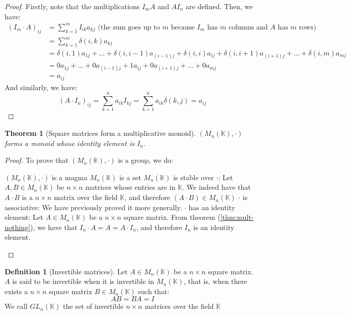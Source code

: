 \documentclass{article}
\newtheorem{theorem}{Theorem}[section]
\theoremstyle{definition}
\newtheorem{definition}{Definition}[section]
\theoremstyle{remark}
\theoremstyle{example}
\begin{document}
\begin{proof}
    Firstly, note that the multiplications $I_m A$ and $A I_n$ are defined. Then, we have:
	\begin{align*}
			(I_m \cdot A)_{ij} &= \sum_{k=1}^m I_{ik} a_{kj} \text{ (the sum goes up to $m$ because $I_m$ has $m$ columns and $A$ has $m$ rows)}\\
							   &= \sum_{k=1}^m \delta(i, k) a_{kj}\\
							   &= \delta(i, 1) a_{1j} + \dots + \delta(i, i-1) a_{(i-1)j} + \delta(i, i) a_{ij} + \delta(i, i+1) a_{(i+1)j} + \dots + \delta(i, m) a_{mj}\\
							   &= 0 a_{1j} + \dots + 0 a_{(i-1)j} + 1 a_{ij} + 0 a_{(i+1)j} + \dots + 0 a_{mj}\\
							   &= a_{ij}
	\end{align*}
	And similarly, we have:
			$$(A \cdot I_n)_{ij} = \sum_{k=1}^n a_{ik} I_{kj} = \sum_{k=1}^n a_{ik} \delta(k, j) = a_{ij}$$
\end{proof}

\begin{theorem}[Square matrices form a multiplicative monoid]
    $(M_n(\mathbb{K}), \cdot)$ forms a monoid whose identity element is $I_n$.
\end{theorem}

\begin{proof}
    To prove that $(M_n(\mathbb{K}), \cdot)$ is a group, we do:
    \begin{outline}
        \1 $(M_n(\mathbb{K}), \cdot)$ is a magma
            \2 $M_n(\mathbb{K})$ is a set
            \2 $M_n(\mathbb{K})$ is stable over $\cdot$: Let $A, B \in M_n(\mathbb{K})$ be $n \times n$ matrices whose entries are in $\mathbb{K}$. We indeed have that $A \cdot B$ is a $n \times n$ matrix over the field $\mathbb{K}$, and therefore $(A \cdot B) \in M_n(\mathbb{K})$
        \1 $\cdot$ is associative: We have previously proved it more generally. 
        \1 $\cdot$ has an identity element: Let $A \in M_n(\mathbb{K})$ be a $n \times n$ square matrix. From theorem (\ref{thm:mult-nothing}), we have that $I_n \cdot A = A = A \cdot I_n$, and therefore $I_n$ is an identity element.
    \end{outline}
\end{proof}

\begin{definition}[Invertible matrices]
    Let $A \in M_n(\mathbb{K})$ be a $n \times n$ square matrix. $A$ is said to be invertible when it is invertible in $M_n(\mathbb{K})$, that is, when there exists a $n \times n$ square matrix $B \in M_n(\mathbb{K})$ such that:
        $$AB = BA = I$$
    We call $GL_n(\mathbb{K})$ the set of invertible $n \times n$ matrices over the field $\mathbb{K}$
\end{definition}
\end{document}
